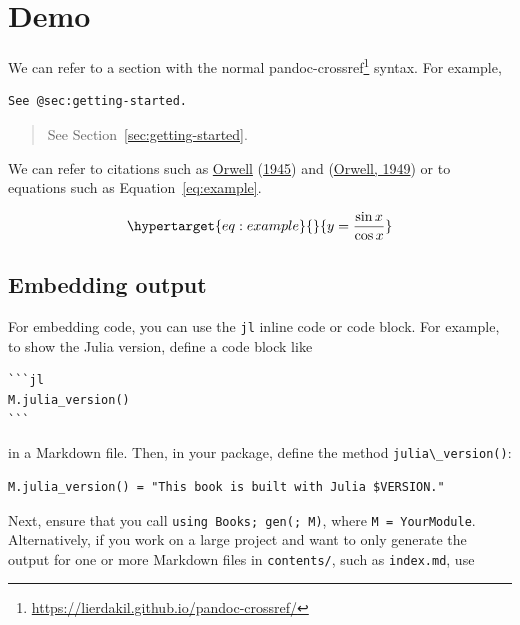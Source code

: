 \documentclass[
  notoc %
]{tufte-book}
\DeclareRobustCommand{\href}[2]{#2\footnote{\url{#1}}}
\newcommand{\passthrough}[1]{#1}
\begin{document}
\hypertarget{sec:demo}{%
\chapter{Demo}\label{sec:demo}}

We can refer to a section with the normal
\href{https://lierdakil.github.io/pandoc-crossref/}{pandoc-crossref}
syntax. For example,

\begin{lstlisting}
See @sec:getting-started.
\end{lstlisting}

\begin{quote}
See Section~\ref{sec:getting-started}.
\end{quote}

We can refer to citations such as
\protect\hyperlink{ref-orwell1945animal}{Orwell}
(\protect\hyperlink{ref-orwell1945animal}{1945}) and
(\protect\hyperlink{ref-orwell1949nineteen}{Orwell, 1949}) or to
equations such as Equation~\ref{eq:example}.

\begin{equation}\protect\hypertarget{eq:example}{}{ y = \frac{\sin{x}}{\cos{x}} }\label{eq:example}\end{equation}

\hypertarget{sec:embedding-output}{%
\section{Embedding output}\label{sec:embedding-output}}

For embedding code, you can use the \passthrough{\lstinline!jl!} inline
code or code block. For example, to show the Julia version, define a
code block like

\begin{lstlisting}
```jl
M.julia_version()
```
\end{lstlisting}

in a Markdown file. Then, in your package, define the method
\passthrough{\lstinline!julia\_version()!}:

\begin{lstlisting}
M.julia_version() = "This book is built with Julia $VERSION."
\end{lstlisting}

Next, ensure that you call
\passthrough{\lstinline!using Books; gen(; M)!}, where
\passthrough{\lstinline!M = YourModule!}. Alternatively, if you work on
a large project and want to only generate the output for one or more
Markdown files in \passthrough{\lstinline!contents/!}, such as
\passthrough{\lstinline!index.md!}, use
\end{document}
